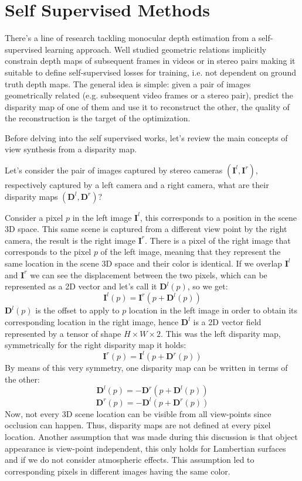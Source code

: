 \newpage
\section{Self Supervised Methods}
\label{s:ssl}
There's a line of research tackling monocular depth estimation from a self-supervised learning approach.
Well studied geometric relations implicitly constrain depth maps of subsequent frames in videos or in stereo pairs making it suitable to define self-supervised losses for training, i.e. not dependent on ground truth depth maps.
The general idea is simple: given a pair of images geometrically related (e.g. subsequent video frames or a stereo pair), predict the disparity map of one of them and use it to reconstruct the other, the quality of the reconstruction is the target of the optimization.

Before delving into the self supervised works, let's review the main concepts of view synthesis from a disparity map.

Let's consider the pair of images captured by stereo cameras $(\mathbf{I}^{l}, \mathbf{I}^{r})$, respectively captured by a left camera and a right camera, what are their disparity maps $(\mathbf{D}^{l}, \mathbf{D}^{r})$?

Consider a pixel $p$ in the left image $\mathbf{I}^{l}$, this corresponds to a position in the scene 3D space.
This same scene is captured from a different view point by the right camera, the result is the right image $\mathbf{I}^{r}$.
There is a pixel of the right image that corresponds to the pixel $p$ of the left image, meaning that they represent the same location in the scene 3D space and their color is identical.
If we overlap $\mathbf{I}^{l}$ and $\mathbf{I}^{r}$ we can see the displacement between the two pixels, which can be represented as a 2D vector and let's call it $\mathbf{D}^{l}(p)$, so we get:
\[
	\mathbf{I}^{l}(p) = \mathbf{I}^{r}(p + \mathbf{D}^{l}(p))
\]
$\mathbf{D}^{l}(p)$ is the offset to apply to $p$ location in the left image in order to obtain its corresponding location in the right image, hence $\mathbf{D}^{l}$ is a 2D vector field represented by a tensor of shape $H \times W \times 2$.
This was the left disparity map, symmetrically for the right disparity map it holds:
\[
	\mathbf{I}^{r}(p) = \mathbf{I}^{l}(p + \mathbf{D}^{r}(p))
\]
By means of this very symmetry, one disparity map can be written in terms of the other:
\[
\mathbf{D}^{l}(p) = - \mathbf{D}^{r}(p + \mathbf{D}^{l}(p))
\]\[
\mathbf{D}^{r}(p) = - \mathbf{D}^{l}(p + \mathbf{D}^{r}(p))
\]
Now, not every 3D scene location can be visible from all view-points since occlusion can happen.
Thus, disparity maps are not defined at every pixel location.
Another assumption that was made during this discussion is that object appearance is view-point independent, this only holds for Lambertian surfaces and if we do not consider atmospheric effects.
This assumption led to corresponding pixels in different images having the same color.


